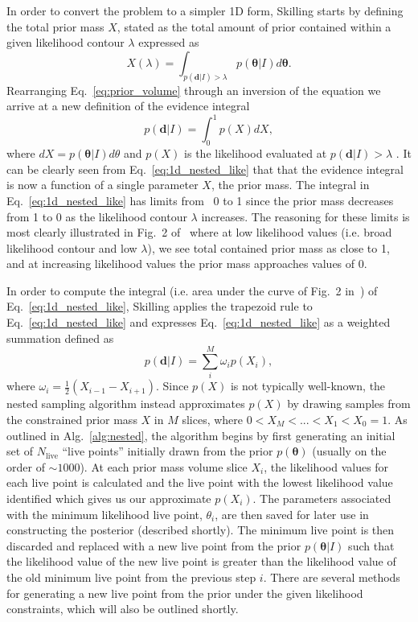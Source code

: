 In order to convert the problem to a simpler 1D form, Skilling 
starts by defining the 
total prior mass $X$, stated as the total amount of 
prior contained within a given likelihood contour $\lambda$ expressed as 
%
\begin{equation}\label{eq:prior_volume}
    X(\lambda) = \int_{p(\bm{d}|I)> \lambda} p(\bm{\theta}|I) d\bm{\theta}.
\end{equation}
%
Rearranging Eq.~\ref{eq:prior_volume} through an inversion of the 
equation we arrive at a 
new definition of the evidence integral
%
\begin{equation}\label{eq:1d_nested_like}
    p(\bm{d}|I) = \int_{0}^{1} p(X) dX, 
\end{equation}
%
where $dX = p(\bm{\theta}|I)d\theta$ and $p(X)$ is the likelihood 
evaluated at $p(\bm{d}|I)> \lambda$
. It can be clearly seen from Eq.~\ref{eq:1d_nested_like} 
that that the evidence integral is now a function of a 
single parameter $X$, the 
prior mass. The integral in Eq.~\ref{eq:1d_nested_like} has limits from \
0 to 1 since the prior mass decreases from 
1 to 0 as the likelihood contour $\lambda$ 
increases. The reasoning for these 
limits is most clearly illustrated in Fig.~{2} of~\cite{skilling2006} 
where at low likelihood 
values (i.e. broad likelihood contour and low $\lambda$), we see 
total contained prior mass 
as close to 1, and at increasing likelihood values the prior mass approaches values of 0.

In order to compute the integral (i.e. area under the curve of Fig.~{2} in~\cite{skilling2006}) 
of Eq.~\ref{eq:1d_nested_like}, 
Skilling applies the trapezoid rule to Eq.~\ref{eq:1d_nested_like} and 
expresses Eq.~\ref{eq:1d_nested_like} as a weighted summation defined as 
%
\begin{equation}\label{eq:approx_sum_nested_evidence}
    p(\bm{d}|I) = \sum_{i}^M \omega_i p(X_i),
\end{equation}
%
where $\omega_i = \frac{1}{2} (X_{i-1} - X_{i+1})$. Since $p(X)$ is not typically well-known, 
the nested sampling algorithm instead approximates $p(X)$ by 
drawing samples from the 
constrained prior mass $X$ in $M$ slices, where $0 < X_{M} < ... < X_1 
< X_0 = 1$. As outlined in Alg.~\ref{alg:nested}, the 
algorithm begins by first generating 
an initial set of $N_{\mathrm{live}}$ ``live points'' 
initially drawn from the prior $p(\bm{\theta})$ 
(usually on the order of $\sim 1000$). At each prior mass volume slice $X_i$, 
the likelihood values for each live point is calculated and the 
live point with the 
lowest likelihood value identified which gives us our approximate $p(X_i)$. 
The parameters associated with the minimum 
likelihood live point, $\theta_i$, are then saved for later use in constructing 
the posterior (described shortly). The minimum live point 
is then discarded and replaced with a new live point from 
the prior $p(\bm{\theta}|I)$ such 
that the likelihood value of the 
new live point is greater than the likelihood value of the old minimum live 
point from the previous step $i$. There are several methods 
for generating a new live point 
from the prior under the given likelihood constraints, which 
will also be outlined shortly.


